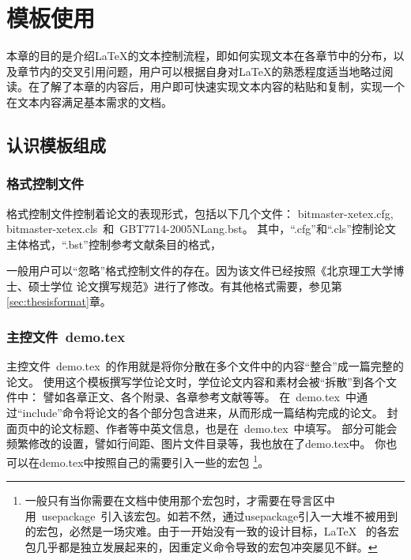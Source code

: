 
\chapter{模板使用}
\label{chap:textStructure}

本章的目的是介绍\LaTeX{}的文本控制流程，即如何实现文本在各章节中的分布，以及章节内的交叉引用问题，用户可以根据自身对\LaTeX{}的熟悉程度适当地略过阅读。在了解了本章的内容后，用户即可快速实现文本内容的粘贴和复制，实现一个在文本内容满足基本需求的文档。



\section{认识模板组成}

\subsection{格式控制文件}
\label{sec:format}

格式控制文件控制着论文的表现形式，包括以下几个文件：
bitmaster-xetex.cfg, bitmaster-xetex.cls~和~GBT7714-2005NLang.bst。
其中，``.cfg''和``.cls''控制论文主体格式，``.bst''控制参考文献条目的格式，

一般用户可以``忽略''格式控制文件的存在。因为该文件已经按照《北京理工大学博士、硕士学位
论文撰写规范》进行了修改。有其他格式需要，参见第\ref{sec:thesisformat}章。


\subsection{主控文件~demo.tex}
\label{sec:demotex}

主控文件~demo.tex~的作用就是将你分散在多个文件中的内容``整合''成一篇完整的论文。
使用这个模板撰写学位论文时，学位论文内容和素材会被``拆散''到各个文件中：
譬如各章正文、各个附录、各章参考文献等等。
在~demo.tex~中通过``include''命令将论文的各个部分包含进来，从而形成一篇结构完成的论文。
封面页中的论文标题、作者等中英文信息，也是在~demo.tex~中填写。
部分可能会频繁修改的设置，譬如行间距、图片文件目录等，我也放在了demo.tex中。
你也可以在demo.tex中按照自己的需要引入一些的宏包
\footnote{一般只有当你需要在文档中使用那个宏包时，才需要在导言区中用~usepackage~引入该宏包。如若不然，通过usepackage引入一大堆不被用到的宏包，必然是一场灾难。由于一开始没有一致的设计目标，\LaTeX~ 的各宏包几乎都是独立发展起来的，因重定义命令导致的宏包冲突屡见不鲜。}。


